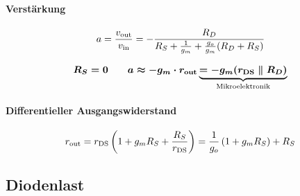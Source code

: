 \smallskip

\paragraph{Verstärkung}

\[
    a = \frac{v_{\rm out}}{v_{\rm in}} = - \frac{R_D}{R_S + \frac{1}{g_m} + \frac{g_o}{g_m}(R_D + R_S)} 
\]

\[
    \boldsymbol{ R_S = 0 \qquad  a \approx - g_m \cdot r_{\rm out} \underbrace{= - g_m (r_{\rm DS} \parallel R_D) }_{\text{Mikroelektronik}} }
\]


\paragraph{Differentieller Ausgangswiderstand}

\vspace{-0.2cm}

\[
    r_{\rm out} = r_{\rm DS} \left( 1 + g_m R_S + \frac{R_S}{r_{\rm DS}} \right) = \frac{1}{g_o} \left( 1 + g_m R_S \right) + R_S
\]


\subsection{Diodenlast}

